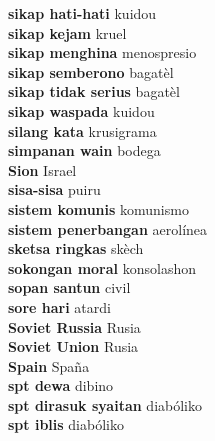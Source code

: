 \textbf{ sikap hati-hati  } kuidou \\
\textbf{ sikap kejam  } kruel \\
\textbf{ sikap menghina  } menospresio \\
\textbf{ sikap semberono  } bagatèl \\
\textbf{ sikap tidak serius  } bagatèl \\
\textbf{ sikap waspada  } kuidou \\
\textbf{ silang kata  } krusigrama \\
\textbf{ simpanan wain  } bodega \\
\textbf{ Sion  } Israel \\
\textbf{ sisa-sisa  } puiru \\
\textbf{ sistem komunis  } komunismo \\
\textbf{ sistem penerbangan  } aerolínea \\
\textbf{ sketsa ringkas  } skèch \\
\textbf{ sokongan moral  } konsolashon \\
\textbf{ sopan santun  } civil \\
\textbf{ sore hari  } atardi \\
\textbf{ Soviet Russia  } Rusia \\
\textbf{ Soviet Union  } Rusia \\
\textbf{ Spain  } Spaña \\
\textbf{ spt dewa  } dibino \\
\textbf{ spt dirasuk syaitan  } diabóliko \\
\textbf{ spt iblis  } diabóliko \\
